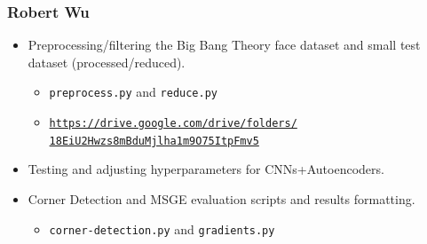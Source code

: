 \documentclass[letterpaper,12pt]{article}
\begin{document}
\subsubsection*{Robert Wu}
\begin{itemize}
    \item Preprocessing/filtering the Big Bang Theory face dataset and small test dataset (processed/reduced). \begin{itemize}
        \item \texttt{preprocess.py} and \texttt{reduce.py}
        \item \href{https://drive.google.com/drive/folders/18EiU2Hwzs8mBduMjlha1m9O75ItpFmv5?usp=sharing}{\texttt{https://drive.google.com/drive/folders/\\18EiU2Hwzs8mBduMjlha1m9O75ItpFmv5}}
    \end{itemize}
    \item Testing and adjusting hyperparameters for CNNs+Autoencoders.
    \item Corner Detection and MSGE evaluation scripts and results formatting. \begin{itemize}
        \item \texttt{corner-detection.py} and \texttt{gradients.py}
    \end{itemize}
\end{itemize}
\end{document}
